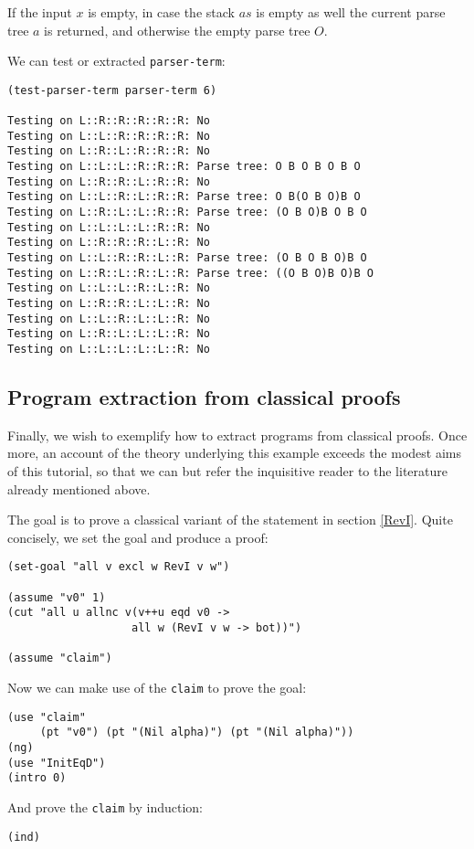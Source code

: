 \documentclass[12pt]{amsart}
\newcommand{\as}{\mathit{a}\!\mathit{s}}
\begin{document}
If the input $x$ is empty, in case the stack $\as$ is empty as well
the current parse tree $a$ is returned, and otherwise the empty parse
tree $O$.

We can test or extracted \verb|parser-term|:
\begin{verbatim}
(test-parser-term parser-term 6)

Testing on L::R::R::R::R::R: No
Testing on L::L::R::R::R::R: No
Testing on L::R::L::R::R::R: No
Testing on L::L::L::R::R::R: Parse tree: O B O B O B O
Testing on L::R::R::L::R::R: No
Testing on L::L::R::L::R::R: Parse tree: O B(O B O)B O
Testing on L::R::L::L::R::R: Parse tree: (O B O)B O B O
Testing on L::L::L::L::R::R: No
Testing on L::R::R::R::L::R: No
Testing on L::L::R::R::L::R: Parse tree: (O B O B O)B O
Testing on L::R::L::R::L::R: Parse tree: ((O B O)B O)B O
Testing on L::L::L::R::L::R: No
Testing on L::R::R::L::L::R: No
Testing on L::L::R::L::L::R: No
Testing on L::R::L::L::L::R: No
Testing on L::L::L::L::L::R: No
\end{verbatim}

\subsection{Program extraction from classical proofs}
Finally, we wish to exemplify how to extract programs from classical
proofs.  Once more, an account of the theory underlying this example
exceeds the modest aims of this tutorial, so that we can but refer the
inquisitive reader to the literature already mentioned above.

The goal is to prove a classical variant of the statement in section
\ref{RevI}.  Quite concisely, we set the goal and produce a proof:
\begin{verbatim}
(set-goal "all v excl w RevI v w")

(assume "v0" 1)
(cut "all u allnc v(v++u eqd v0 ->
                   all w (RevI v w -> bot))")

(assume "claim")
\end{verbatim}

Now we can make use of the \texttt{claim} to prove the goal:
\begin{verbatim}
(use "claim"
     (pt "v0") (pt "(Nil alpha)") (pt "(Nil alpha)"))
(ng)
(use "InitEqD")
(intro 0)
\end{verbatim}

And prove the \texttt{claim} by induction:
\begin{verbatim}
(ind)
\end{verbatim}
\end{document}
